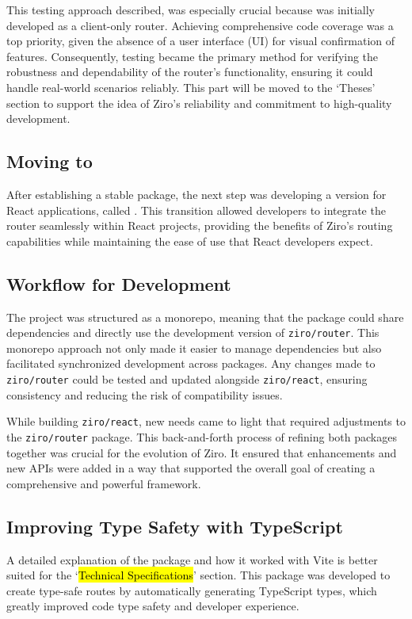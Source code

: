 This testing approach described, was especially crucial because  was initially developed as a client-only router. Achieving comprehensive code coverage was a top priority, given the absence of a user interface (UI) for visual confirmation of features. Consequently, testing became the primary method for verifying the robustness and dependability of the router’s functionality, ensuring it could handle real-world scenarios reliably. This part will be moved to the ‘Theses’ section to support the idea of Ziro’s reliability and commitment to high-quality development.

\subsection{Moving to }
After establishing a stable  package, the next step was developing a version for React applications, called . This transition allowed developers to integrate the router seamlessly within React projects, providing the benefits of Ziro’s routing capabilities while maintaining the ease of use that React developers expect.

\subsection{Workflow for Development}
The project was structured as a monorepo, meaning that the  package could share dependencies and directly use the development version of \texttt{ziro/router}. This monorepo approach not only made it easier to manage dependencies but also facilitated synchronized development across packages. Any changes made to \texttt{ziro/router} could be tested and updated alongside \texttt{ziro/react}, ensuring consistency and reducing the risk of compatibility issues.

While building \texttt{ziro/react}, new needs came to light that required adjustments to the \texttt{ziro/router} package. This back-and-forth process of refining both packages together was crucial for the evolution of Ziro. It ensured that enhancements and new APIs were added in a way that supported the overall goal of creating a comprehensive and powerful framework.


\subsection{Improving Type Safety with TypeScript}
A detailed explanation of the  package and how it worked with Vite is better suited for the ‘\hl{Technical Specifications}’ section. This package was developed to create type-safe routes by automatically generating TypeScript types, which greatly improved code type safety and developer experience.

